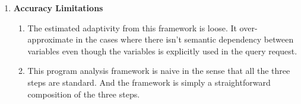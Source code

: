 {\begin{enumerate}
\begin{enumerate}
    have loop with arithmetic expression like $10 + 4$ in the guard.
    Concretely, a simple example program with loop iterating $5$ times as follows isn't allowed in their work.
    \[
      {\assign{x}{5}};
      \assign{z}{q(x)};
      \eloop (x ) \edo 
      \{
        \assign{z}{q(x + z)};
        \}\}
      \] 
    \item For the same reason as above, their \textbf{Graph Generation} algorithm is limited as well.
    \end{enumerate}
    \item \textbf{Accuracy Limitations}
    \begin{enumerate}
        \item The estimated adaptivity from this framework is loose.
        It over-approximate in the cases where there isn't semantic dependency between variables even though the variables
        is explicitly used in the query request.
        \item This program analysis framework is naive in the sense that all the three steps are standard.
    And the framework is simply a straightforward composition of the three steps.
    \end{enumerate}
\end{enumerate}
}
